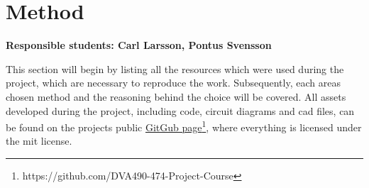 \section{Method}
\label{section:method}


\textbf{Responsible students: Carl Larsson, Pontus Svensson}


This section will begin by listing all the resources which were used during the project, which are necessary to reproduce the work. Subsequently, each areas chosen method and the reasoning behind the choice will be covered.
All assets developed during the project, including code, circuit diagrams and \ac{cad} files, can be found on the projects public \href{https://github.com/DVA490-474-Project-Course}{GitGub page}\footnote{https://github.com/DVA490-474-Project-Course}, where everything is licensed under the \acs{mit} license.


